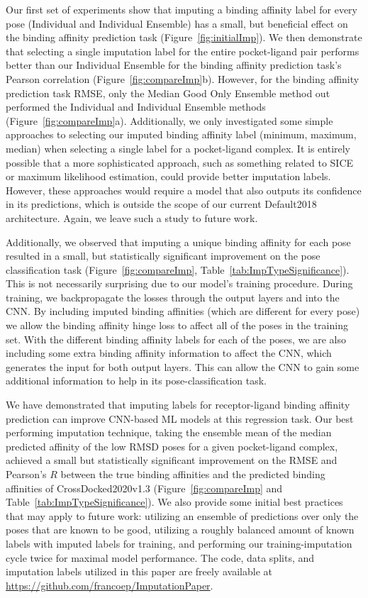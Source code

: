 \documentclass[journal=jcim,manuscript=article]{achemso}
\begin{document}
Our first set of experiments show that imputing a binding affinity label for every pose (Individual and Individual Ensemble) has a small, but beneficial effect on the binding affinity prediction task (Figure~\ref{fig:initialImp}).
We then demonstrate that selecting a single imputation label for the entire pocket-ligand pair performs better than our Individual Ensemble for the binding affinity prediction task's Pearson correlation (Figure~\ref{fig:compareImp}b).
However, for the binding affinity prediction task RMSE, only the Median Good Only Ensemble method out performed the Individual and Individual Ensemble methods (Figure~\ref{fig:compareImp}a).
Additionally, we only investigated some simple approaches to selecting our imputed binding affinity label (minimum, maximum, median) when selecting a single label for a pocket-ligand complex.
It is entirely possible that a more sophisticated approach, such as something related to SICE\cite{SICE} or maximum likelihood estimation, could provide better imputation labels.
However, these approaches would require a model that also outputs its confidence in its predictions, which is outside the scope of our current Default2018 architecture.
Again, we leave such a study to future work.

Additionally, we observed that imputing a unique binding affinity for each pose resulted in a small, but statistically significant improvement on the pose classification task (Figure~\ref{fig:compareImp}, Table~\ref{tab:ImpTypeSignificance}).
This is not necessarily surprising due to our model's training procedure.
During training, we backpropagate the losses through the output layers and into the CNN.
By including imputed binding affinities (which are different for every pose) we allow the binding affinity hinge loss to affect all of the poses in the training set.
With the different binding affinity labels for each of the poses, we are also including some extra binding affinity information to affect the CNN, which generates the input for both output layers.
This can allow the CNN to gain some additional information to help in its pose-classification task.


We have demonstrated that imputing labels for receptor-ligand binding affinity prediction can improve CNN-based ML models at this regression task.
Our best performing imputation technique, taking the ensemble mean of the median predicted affinity of the low RMSD poses for a given pocket-ligand complex, achieved a small but statistically significant improvement on the RMSE and Pearson's $R$ between the true binding affinities and the predicted binding affinities of CrossDocked2020v1.3 (Figure~\ref{fig:compareImp} and Table~\ref{tab:ImpTypeSignificance}).
We also provide some initial best practices that may apply to future work: utilizing an ensemble of predictions over only the poses that are known to be good, utilizing a roughly balanced amount of known labels with imputed labels for training, and performing our training-imputation cycle twice for maximal model performance.
The code, data splits, and imputation labels utilized in this paper are freely available at \url{https://github.com/francoep/ImputationPaper}.
\end{document}
